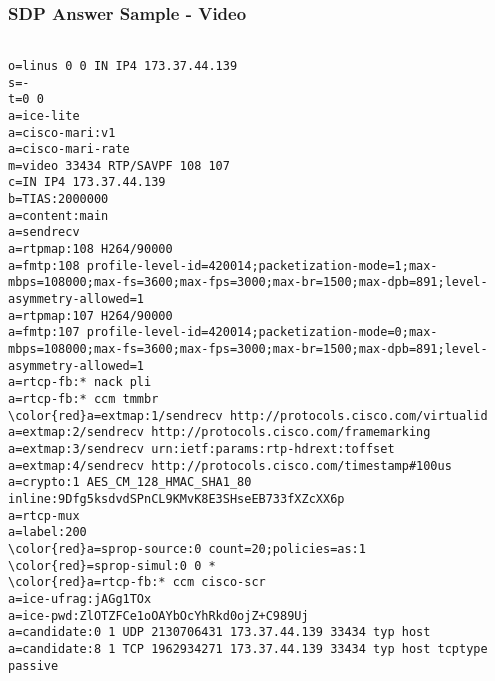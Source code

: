 \documentclass{beamer}
\begin{document}
\begin{frame}[fragile]
  \frametitle{SDP Answer Sample - Video}

\begin{center}
  \begin{BVerbatim}[fontfamily=courier, fontsize=\relsize{-5}, commandchars=\\\{\}]

o=linus 0 0 IN IP4 173.37.44.139
s=-
t=0 0
a=ice-lite
a=cisco-mari:v1
a=cisco-mari-rate
m=video 33434 RTP/SAVPF 108 107
c=IN IP4 173.37.44.139
b=TIAS:2000000
a=content:main
a=sendrecv
a=rtpmap:108 H264/90000
a=fmtp:108 profile-level-id=420014;packetization-mode=1;max-mbps=108000;max-fs=3600;max-fps=3000;max-br=1500;max-dpb=891;level-asymmetry-allowed=1
a=rtpmap:107 H264/90000
a=fmtp:107 profile-level-id=420014;packetization-mode=0;max-mbps=108000;max-fs=3600;max-fps=3000;max-br=1500;max-dpb=891;level-asymmetry-allowed=1
a=rtcp-fb:* nack pli
a=rtcp-fb:* ccm tmmbr
\color{red}a=extmap:1/sendrecv http://protocols.cisco.com/virtualid
a=extmap:2/sendrecv http://protocols.cisco.com/framemarking
a=extmap:3/sendrecv urn:ietf:params:rtp-hdrext:toffset
a=extmap:4/sendrecv http://protocols.cisco.com/timestamp#100us
a=crypto:1 AES_CM_128_HMAC_SHA1_80 inline:9Dfg5ksdvdSPnCL9KMvK8E3SHseEB733fXZcXX6p
a=rtcp-mux
a=label:200
\color{red}a=sprop-source:0 count=20;policies=as:1
\color{red}=sprop-simul:0 0 *
\color{red}a=rtcp-fb:* ccm cisco-scr
a=ice-ufrag:jAGg1TOx
a=ice-pwd:ZlOTZFCe1oOAYbOcYhRkd0ojZ+C989Uj
a=candidate:0 1 UDP 2130706431 173.37.44.139 33434 typ host
a=candidate:8 1 TCP 1962934271 173.37.44.139 33434 typ host tcptype passive

\end{BVerbatim}
\end{center}
\end{frame}
\end{document}
